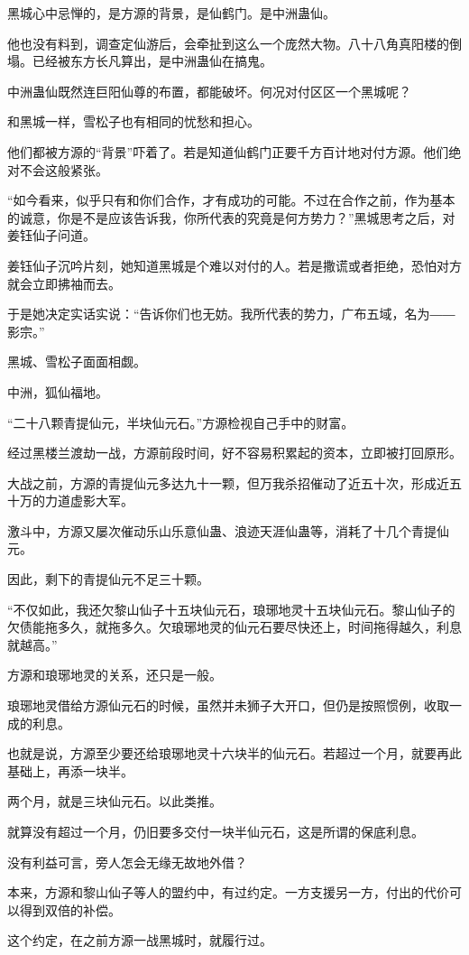 \begin{this_body}
黑城心中忌惮的，是方源的背景，是仙鹤门。是中洲蛊仙。

他也没有料到，调查定仙游后，会牵扯到这么一个庞然大物。八十八角真阳楼的倒塌。已经被东方长凡算出，是中洲蛊仙在搞鬼。

中洲蛊仙既然连巨阳仙尊的布置，都能破坏。何况对付区区一个黑城呢？

和黑城一样，雪松子也有相同的忧愁和担心。

他们都被方源的“背景”吓着了。若是知道仙鹤门正要千方百计地对付方源。他们绝对不会这般紧张。

“如今看来，似乎只有和你们合作，才有成功的可能。不过在合作之前，作为基本的诚意，你是不是应该告诉我，你所代表的究竟是何方势力？”黑城思考之后，对姜钰仙子问道。

姜钰仙子沉吟片刻，她知道黑城是个难以对付的人。若是撒谎或者拒绝，恐怕对方就会立即拂袖而去。

于是她决定实话实说：“告诉你们也无妨。我所代表的势力，广布五域，名为――影宗。”

黑城、雪松子面面相觑。

中洲，狐仙福地。

“二十八颗青提仙元，半块仙元石。”方源检视自己手中的财富。

经过黑楼兰渡劫一战，方源前段时间，好不容易积累起的资本，立即被打回原形。

大战之前，方源的青提仙元多达九十一颗，但万我杀招催动了近五十次，形成近五十万的力道虚影大军。

激斗中，方源又屡次催动乐山乐意仙蛊、浪迹天涯仙蛊等，消耗了十几个青提仙元。

因此，剩下的青提仙元不足三十颗。

“不仅如此，我还欠黎山仙子十五块仙元石，琅琊地灵十五块仙元石。黎山仙子的欠债能拖多久，就拖多久。欠琅琊地灵的仙元石要尽快还上，时间拖得越久，利息就越高。”

方源和琅琊地灵的关系，还只是一般。

琅琊地灵借给方源仙元石的时候，虽然并未狮子大开口，但仍是按照惯例，收取一成的利息。

也就是说，方源至少要还给琅琊地灵十六块半的仙元石。若超过一个月，就要再此基础上，再添一块半。

两个月，就是三块仙元石。以此类推。

就算没有超过一个月，仍旧要多交付一块半仙元石，这是所谓的保底利息。

没有利益可言，旁人怎会无缘无故地外借？

本来，方源和黎山仙子等人的盟约中，有过约定。一方支援另一方，付出的代价可以得到双倍的补偿。

这个约定，在之前方源一战黑城时，就履行过。


\end{this_body}
